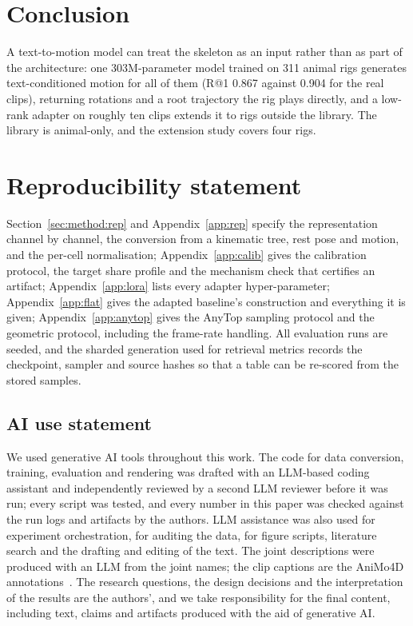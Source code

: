 \section{Conclusion}\label{sec:conclusion}

A text-to-motion model can treat the skeleton as an input rather than as part of the architecture:
one \num{303}M-parameter model trained on \num{311} animal rigs generates text-conditioned motion for
all of them (R@1 \num{0.867} against \num{0.904} for the real clips), returning rotations and a root
trajectory the rig plays directly, and a low-rank adapter on roughly ten clips extends it to
rigs outside the library. The library is animal-only, and the extension study covers four rigs.

\section*{Reproducibility statement}

Section~\ref{sec:method:rep} and Appendix~\ref{app:rep} specify the representation channel by
channel, the conversion from a kinematic tree, rest pose and motion, and the per-cell
normalisation; Appendix~\ref{app:calib} gives the calibration protocol, the target share profile
and the mechanism check that certifies an artifact; Appendix~\ref{app:lora} lists every adapter
hyper-parameter; Appendix~\ref{app:flat} gives the adapted baseline's construction and everything it is
given; Appendix~\ref{app:anytop} gives the AnyTop sampling protocol and the geometric
protocol, including the frame-rate handling. All evaluation runs are seeded, and the sharded
generation used for retrieval metrics records the checkpoint, sampler and source hashes so that
a table can be re-scored from the stored samples.

\subsection*{AI use statement}
We used generative AI tools throughout this work. The code for data conversion, training, evaluation
and rendering was drafted with an LLM-based coding assistant and independently reviewed by a second
LLM reviewer before it was run; every script was tested, and every number in this paper was checked
against the run logs and artifacts by the authors. LLM assistance was also used for experiment
orchestration, for auditing the data, for figure scripts, literature search
and the drafting and editing of the text. The joint descriptions were produced with an LLM from the joint names; the clip captions are the
AniMo4D annotations~\citep{wang2025animo}. The research
questions, the design decisions and the interpretation of the results are the authors', and we take
responsibility for the final content, including text, claims and artifacts produced with the aid of
generative AI.

